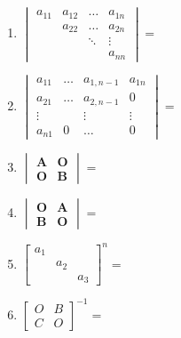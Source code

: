 \documentclass[a4paper,12pt]{article}
\begin{document}
    \pagestyle{empty}
    \begin{minipage}[t]{0.30\textwidth}
        \begin{enumerate}[leftmargin=0.2em, itemsep=1.1em]
            \item $\begin{vmatrix}
                       a_{11} & a_{12} & \dots  & a_{1n} \\
                       & a_{22} & \dots  & a_{2n} \\
                       &        & \ddots & \vdots \\
                       &        &        & a_{nn}
            \end{vmatrix}=$
            \item $\begin{vmatrix}
                       a_{11}  & \dots & a_{1,n-1} & a_{1n} \\
                       a_{21} & \dots & a_{2,n-1} & 0      \\
                       \vdots &        & \vdots    & \vdots \\
                       a_{n1} & 0     & \dots & 0
            \end{vmatrix} =$
            \item $\begin{vmatrix}
                       \mathbf{A} & \mathbf{O}          \\
                       \mathbf{O} & \mathbf{B}
            \end{vmatrix} =$
            \item $\begin{vmatrix}
                       \mathbf{O}          & \mathbf{A} \\
                       \mathbf{B} & \mathbf{O}
            \end{vmatrix} =$
            \item $\begin{bmatrix}
                       a_1 &     &     \\
                       & a_2 &     \\
                       &     & a_3
            \end{bmatrix}^n =$
            \item $\begin{bmatrix}
                       O & B \\
                       C & O
            \end{bmatrix}^{-1} =$
        \end{enumerate}
    \end{minipage}
\end{document}
